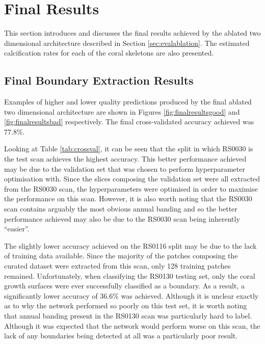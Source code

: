 \section{Final Results}
\label{sec:finalresults}

This section introduces and discusses the final results achieved by the ablated two dimensional architecture described in Section \ref{sec:evalablation}. The estimated calcification rates for each of the coral skeletons are also presented.

\subsection{Final Boundary Extraction Results}

Examples of higher and lower quality predictions produced by the final ablated two dimensional architecture are shown in Figures \ref{fig:finalresultsgood} and \ref{fig:finalresultsbad} respectively. The final cross-validated accuracy achieved was 77.8\%.

Looking at Table \ref{tab:crossval}, it can be seen that the split in which RS0030 is the test scan achieves the highest accuracy. This better performance achieved may be due to the validation set that was chosen to perform hyperparameter optimisation with. Since the slices composing the validation set were all extracted from the RS0030 scan, the hyperparameters were optimised in order to maximise the performance on this scan. However, it is also worth noting that the RS0030 scan contains arguably the most obvious annual banding and so the better performance achieved may also be due to the RS0030 scan being inherently ``easier''.

The slightly lower accuracy achieved on the RS0116 split may be due to the lack of training data available. Since the majority of the patches composing the curated dataset were extracted from this scan, only 128 training patches remained. Unfortunately, when classifying the RS0130 testing set, only the coral growth surfaces were ever successfully classified as a boundary. As a result, a significantly lower accuracy of 36.6\% was achieved. Although it is unclear exactly as to why the network performed so poorly on this test set, it is worth noting that annual banding present in the RS0130 scan was particularly hard to label. Although it was expected that the network would perform worse on this scan, the lack of any boundaries being detected at all was a particularly poor result.

